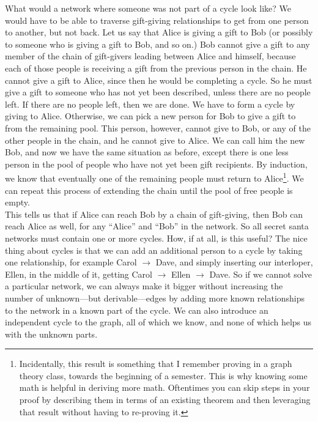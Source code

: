 \documentclass{article}
\begin{document}
What would a network where someone was not part of a cycle look like? We would have to be able to traverse gift-giving relationships to get from one person to another, but not back. Let us say that Alice is giving a gift to Bob (or possibly to someone who is giving a gift to Bob, and so on.) Bob cannot give a gift to any member of the chain of gift-givers leading between Alice and himself, because each of those people is receiving a gift from the previous person in the chain. He cannot give a gift to Alice, since then he would be completing a cycle. So he must give a gift to someone who has not yet been described, unless there are no people left. If there are no people left, then we are done. We have to form a cycle by giving to Alice. Otherwise, we can pick a new person for Bob to give a gift to from the remaining pool. This person, however, cannot give to Bob, or any of the other people in the chain, and he cannot give to Alice. We can call him the new Bob, and now we have the same situation as before, except there is one less person in the pool of people who have not yet been gift recipients. By induction, we know that eventually one of the remaining people must return to Alice\footnote{Incidentally, this result is something that I remember proving in a graph theory class, towards the beginning of a semester. This is why knowing some math is helpful in deriving more math. Oftentimes you can skip steps in your proof by describing them in terms of an existing theorem and then leveraging that result without having to re-proving it.}. We can repeat this process of extending the chain until the pool of free people is empty.\\

This tells us that if Alice can reach Bob by a chain of gift-giving, then Bob can reach Alice as well, for any ``Alice'' and ``Bob'' in the network. So all secret santa networks must contain one or more cycles. How, if at all, is this useful? The nice thing about cycles is that we can add an additional person to a cycle by taking one relationship, for example Carol $\rightarrow$ Dave, and simply inserting our interloper, Ellen, in the middle of it, getting Carol $\rightarrow$ Ellen $\rightarrow$ Dave. So if we cannot solve a particular network, we can always make it bigger without increasing the number of unknown---but derivable---edges by adding more known relationships to the network in a known part of the cycle. We can also introduce an independent cycle to the graph, all of which we know, and none of which helps us with the unknown parts.\\
\end{document}
